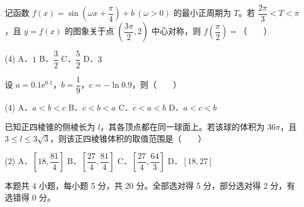 \begin{question}
记函数 $f(x)=\sin\left(\omega x+\dfrac\pi4\right)+b\ (\omega>0)$ 的最小正周期为 $T$。若 $\dfrac{2\pi}3<T<\pi$，且 $y=f(x)$ 的图象关于点 $\left(\dfrac{3\pi}2,2\right)$ 中心对称，则 $f\left(\dfrac\pi2\right)=$\mbox{（　　）}

\begin{gkopts}(4)
\task A．$1$
\task B．$\dfrac32$
\task C．$\dfrac52$
\task D．$3$
\end{gkopts}

\end{question}
\begin{question}
设 $a=0.1\mathrm e^{0.1}$，$b=\dfrac19$，$c=-\ln0.9$，则\mbox{（　　）}

\begin{gkopts}(4)
\task A．$a<b<c$
\task B．$c<b<a$
\task C．$c<a<b$
\task D．$a<c<b$
\end{gkopts}

\end{question}
\begin{question}
已知正四棱锥的侧棱长为 $l$，其各顶点都在同一球面上。若该球的体积为 $36\pi$，且 $3\le l\le3\sqrt3$，则该正四棱锥体积的取值范围是\mbox{（　　）}

\begin{gkopts}(2)
\task A．$\left[18,\dfrac{81}4\right]$
\task B．$\left[\dfrac{27}4,\dfrac{81}4\right]$
\task C．$\left[\dfrac{27}4,\dfrac{64}3\right]$
\task D．$[18,27]$
\end{gkopts}

\par\medskip

\end{question}

\begin{gktip}
本题共 4 小题，每小题 5 分，共 20 分。全部选对得 5 分，部分选对得 2 分，有选错得 0 分。
\end{gktip}

